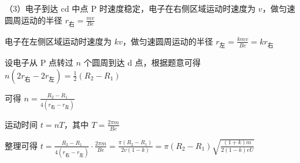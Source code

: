 \documentclass[\gkver]{gaokaozhenti}
\begin{document}
\begin{enumerate}
{（3）电子到达 cd 中点 P 时速度稳定，电子在右侧区域运动时速度为 $v$，做匀速圆周运动的半径 $r_{\text{右}} = \frac{mv}{Be}$

电子在左侧区域运动时速度为 $kv$，做匀速圆周运动的半径 $r_{\text{左}} = \frac{kmv}{Be} = kr_{\text{右}}$

设电子从 P 点转过 $n$ 个圆周到达 d 点，根据题意可得 $n(2r_{\text{右}} - 2r_{\text{左}}) = \frac{1}{2}(R_{2} - R_{1})$

可得 $n = \frac{R_{2} - R_{1}}{4(r_{\text{右}} - r_{\text{左}})}$

运动时间 $t = nT$，其中 $T = \frac{2\pi m}{Be}$

整理可得 $t = \frac{R_{2} - R_{1}}{4(r_{\text{右}} - r_{\text{左}})} \cdot \frac{2\pi m}{Be} = \frac{\pi(R_{2} - R_{1})}{2v(1 - k)} = \pi(R_{2} - R_{1})\sqrt{\frac{(1 + k)m}{2(1 - k)eU}}$
}

\end{enumerate}
\end{document}
